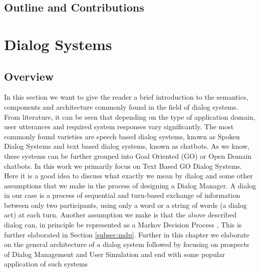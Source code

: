 \documentclass[14pt]{extarticle}
\numberwithin{equation}{section}
\begin{document}
	\subsection{Outline and Contributions}
	\pagebreak
	\section{Dialog Systems}
	\subsection{Overview}
	In this section we want to give the reader a brief introduction to the semantics, components and architecture commonly found in the field of dialog systems. From literature, it can be seen that depending on the type of application domain, user utterances and required system responses vary significantly. The most commonly found varieties are speech based dialog systems, known as Spoken Dialog Systems and text based dialog systems, known as chatbots. As we know, these systems can be further grouped into Goal Oriented (GO) or Open Domain chatbots. In this work we primarily focus on Text Based GO Dialog Systems. Here it is a good idea to discuss what exactly we mean by dialog and some other assumptions that we make in the process of designing a Dialog Manager. A dialog in our case is a process of sequential and turn-based exchange of information between only two participants, using only a word or a string of words (a dialog act) at each turn. Another assumption we make is that the above described dialog can, in principle be represented as a Markov Decision Process \cite{mdp-pieraccini}, This is further elaborated in Section \ref{subsec:mdp}. Further in this chapter we elaborate on the general architecture of a dialog system followed by focusing on prospects of Dialog Management and User Simulation and end with some popular application of such systems
\end{document}
